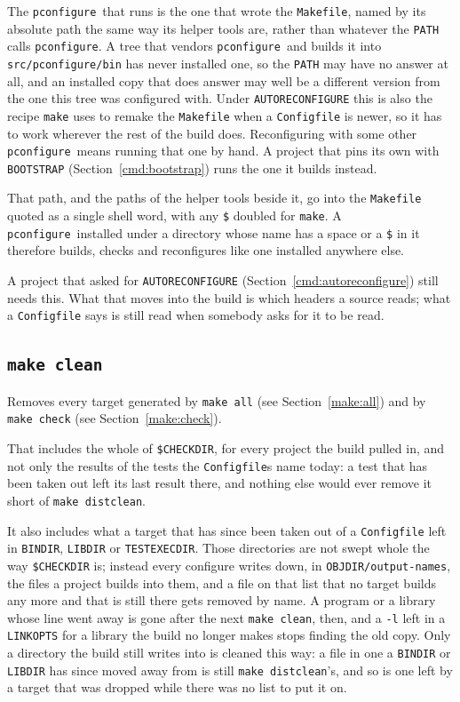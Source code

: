 \documentclass{article}
\newcommand{\pconfigure}{\texttt{pconfigure}}
\begin{document}
The \pconfigure\ that runs is the one that wrote the
\texttt{Makefile}, named by its absolute path the same way its helper
tools are, rather than whatever the \texttt{PATH} calls \pconfigure.
A tree that vendors \pconfigure\ and builds it into
\texttt{src/pconfigure/bin} has never installed one, so the
\texttt{PATH} may have no answer at all, and an installed copy that
does answer may well be a different version from the one this tree was
configured with.  Under \texttt{AUTORECONFIGURE} this is also the
recipe \texttt{make} uses to remake the \texttt{Makefile} when a
\texttt{Configfile} is newer, so it has to work wherever the rest of
the build does.  Reconfiguring with some other \pconfigure\ means
running that one by hand.  A project that pins its own with
\texttt{BOOTSTRAP} (Section~\ref{cmd:bootstrap}) runs the one it
builds instead.

That path, and the paths of the helper tools beside it, go into the
\texttt{Makefile} quoted as a single shell word, with any \texttt{\$}
doubled for \texttt{make}.  A \pconfigure\ installed under a directory
whose name has a space or a \texttt{\$} in it therefore builds,
checks and reconfigures like one installed anywhere else.

A project that asked for \texttt{AUTORECONFIGURE}
(Section~\ref{cmd:autoreconfigure}) still needs this.  What that moves
into the build is which headers a source reads; what a
\texttt{Configfile} says is still read when somebody asks for it to be
read.

\subsection{\texttt{make clean} \label{make:clean}}

Removes every target generated by \texttt{make all} (see
Section~\ref{make:all}) and by \texttt{make check} (see
Section~\ref{make:check}).

That includes the whole of \texttt{\$CHECKDIR}, for every project the
build pulled in, and not only the results of the tests the
\texttt{Configfile}s name today: a test that has been taken out left
its last result there, and nothing else would ever remove it short of
\texttt{make distclean}.

It also includes what a target that has since been taken out of a
\texttt{Configfile} left in \texttt{BINDIR}, \texttt{LIBDIR} or
\texttt{TESTEXECDIR}.  Those directories are not swept whole the way
\texttt{\$CHECKDIR} is; instead every configure writes down, in
\texttt{OBJDIR/output-names}, the files a project builds into them,
and a file on that list that no target builds any more and that is
still there gets removed by name.  A program or a library whose line
went away is gone after the next \texttt{make clean}, then, and a
\texttt{-l} left in a \texttt{LINKOPTS} for a library the build no
longer makes stops finding the old copy.  Only a directory the build
still writes into is cleaned this way: a file in one a \texttt{BINDIR}
or \texttt{LIBDIR} has since moved away from is still
\texttt{make distclean}'s, and so is one left by a target that was
dropped while there was no list to put it on.
\end{document}
